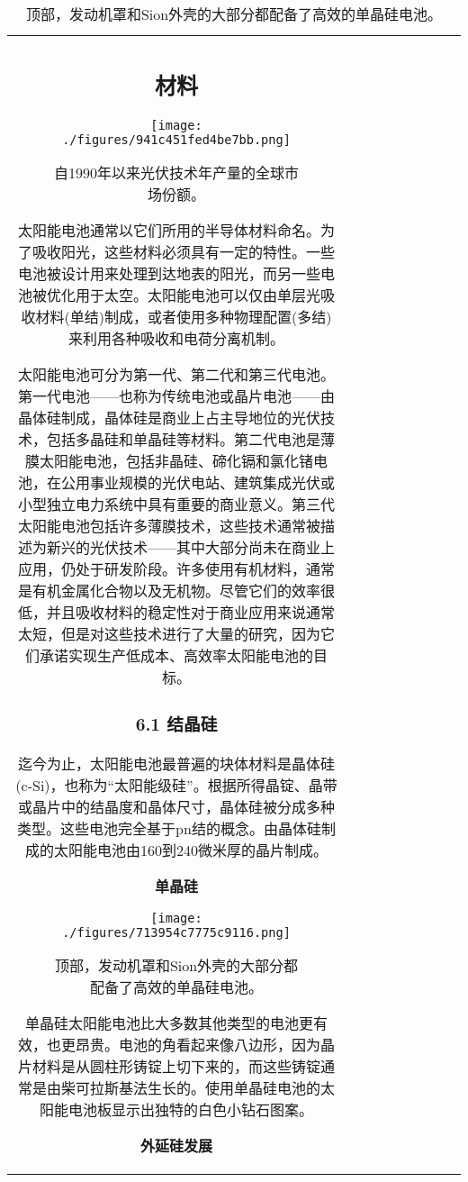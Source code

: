 \begin{table}[ht]
\begin{tabular}{|c|c|c|c|c|c|c|c|c}
\subsection{材料}

\begin{figure}[ht]
\centering
\texttt{[image: ./figures/941c451fed4be7bb.png]}
\caption{自1990年以来光伏技术年产量的全球市场份额。} \label{fig_TYNDC_8}
\end{figure}

太阳能电池通常以它们所用的半导体材料命名。为了吸收阳光，这些材料必须具有一定的特性。一些电池被设计用来处理到达地表的阳光，而另一些电池被优化用于太空。太阳能电池可以仅由单层光吸收材料(单结)制成，或者使用多种物理配置(多结)来利用各种吸收和电荷分离机制。

太阳能电池可分为第一代、第二代和第三代电池。第一代电池——也称为传统电池或晶片电池——由晶体硅制成，晶体硅是商业上占主导地位的光伏技术，包括多晶硅和单晶硅等材料。第二代电池是薄膜太阳能电池，包括非晶硅、碲化镉和氯化锗电池，在公用事业规模的光伏电站、建筑集成光伏或小型独立电力系统中具有重要的商业意义。第三代太阳能电池包括许多薄膜技术，这些技术通常被描述为新兴的光伏技术——其中大部分尚未在商业上应用，仍处于研发阶段。许多使用有机材料，通常是有机金属化合物以及无机物。尽管它们的效率很低，并且吸收材料的稳定性对于商业应用来说通常太短，但是对这些技术进行了大量的研究，因为它们承诺实现生产低成本、高效率太阳能电池的目标。

\subsubsection{6.1 结晶硅}

迄今为止，太阳能电池最普遍的块体材料是晶体硅(c-Si)，也称为“太阳能级硅”。根据所得晶锭、晶带或晶片中的结晶度和晶体尺寸，晶体硅被分成多种类型。这些电池完全基于pn结的概念。由晶体硅制成的太阳能电池由160到240微米厚的晶片制成。

\textbf{单晶硅}

\begin{figure}[ht]
\centering
\texttt{[image: ./figures/713954c7775c9116.png]}
\caption{顶部，发动机罩和Sion外壳的大部分都配备了高效的单晶硅电池。} \label{fig_TYNDC_7}
\end{figure}

单晶硅太阳能电池比大多数其他类型的电池更有效，也更昂贵。电池的角看起来像八边形，因为晶片材料是从圆柱形铸锭上切下来的，而这些铸锭通常是由柴可拉斯基法生长的。使用单晶硅电池的太阳能电池板显示出独特的白色小钻石图案。

\textbf{外延硅发展}


\end{tabular}
\end{table}
